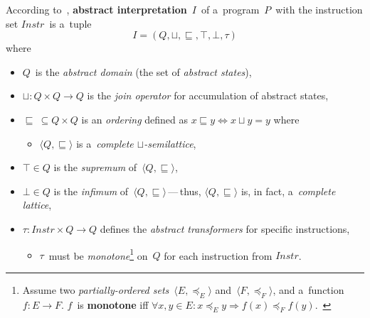 \begin{definition}
    \label{def:AI}
    According to~\cite{AILatticeModelCousot, savAI}, \textbf{abstract interpretation}~$ I $~of a~program~$ P $~with the instruction set $ Instr $~is a~tuple
    $$
        I = (Q, \sqcup, \sqsubseteq, \top, \bot, \tau)
    $$
    where
    \begin{itemize}
        \item $ Q $~is the \emph{abstract domain} (the set of \emph{abstract states}),

        \item $ \sqcup : Q \times Q \rightarrow Q $ is the \emph{join operator} for accumulation of abstract states,

        \item $ \sqsubseteq\ \subseteq Q \times Q $ is an \emph{ordering} defined as $ x \sqsubseteq y \Longleftrightarrow x \sqcup y = y $ where
            \begin{itemize}
                \item $ \langle Q, \sqsubseteq \rangle $ is a~\emph{complete $ \sqcup $-semilattice},
            \end{itemize}

        \item $ \top \in Q $ is the \emph{supremum} of~$ \langle Q, \sqsubseteq \rangle $,

        \item $ \bot \in Q $ is the \emph{infimum} of~$ \langle Q, \sqsubseteq \rangle $\,---\,thus, $ \langle Q, \sqsubseteq \rangle $ is, in fact, a~\emph{complete lattice},

        \item $ \tau : Instr \times Q \rightarrow Q $ defines the \emph{abstract transformers} for specific instructions,
            \begin{itemize}
                \item $ \tau $~must be \emph{monotone}\footnote{Assume two \emph{partially-ordered sets}~$ \langle E, \preceq_E \rangle $ and~$ \langle F, \preceq_F \rangle $, and a~function $ f : E \rightarrow F $. $ f $~is \textbf{monotone} iff $ \forall x, y \in E : x \preceq_E y \Longrightarrow f(x) \preceq_F f(y) $.~\cite{staticAnalysisRival}} on~$ Q $ for each instruction from $ Instr $.
            \end{itemize}
    \end{itemize}
\end{definition}

